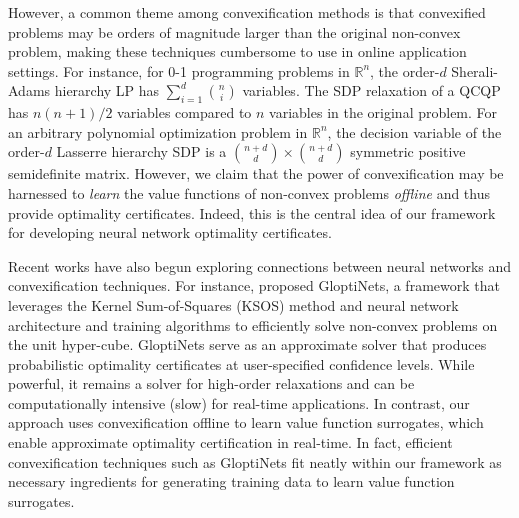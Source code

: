 \documentclass[10pt]{article} %
\theoremstyle{plain}
\theoremstyle{definition}
\theoremstyle{remark}
\begin{document}
However, a common theme among convexification methods is that convexified problems may be orders of magnitude larger than the original non-convex problem, making these techniques cumbersome to use in online application settings. 
For instance, for 0-1 programming problems in $\mathbb{R}^n$, the order-$d$ Sherali-Adams hierarchy LP has $\sum_{i=1}^{d}\binom{n}{i}$ variables.
The SDP relaxation of a QCQP has $n(n+1)/2$ variables compared to $n$ variables in the original problem.
For an arbitrary polynomial optimization problem in $\mathbb{R}^n$, the decision variable of the order-$d$ Lasserre hierarchy SDP is a $\binom{n+d}{d} \times \binom{n+d}{d}$ symmetric positive semidefinite matrix. %
However, we claim that the power of convexification may be harnessed to \textit{learn} the value functions of non-convex problems \textit{offline} and thus provide optimality certificates. Indeed, this is the central idea of our framework for developing neural network optimality certificates.

{Recent works 
have also begun exploring connections between neural networks and convexification techniques. For instance, \citet{beugnot2023gloptinetsscalablenonconvexoptimization} proposed GloptiNets, a framework that leverages the Kernel Sum-of-Squares (KSOS) method and neural network architecture and training algorithms to efficiently solve non-convex problems on the unit hyper-cube. GloptiNets serve as an approximate solver that produces probabilistic optimality certificates at user-specified confidence levels. While powerful, it remains a solver for high-order relaxations and can be computationally intensive (slow) for real-time applications. In contrast, our approach uses convexification offline to learn value function surrogates, which enable approximate optimality certification in real-time. In fact, efficient convexification techniques such as GloptiNets fit neatly within our framework as necessary ingredients for generating training data to learn value function surrogates.}
\end{document}
